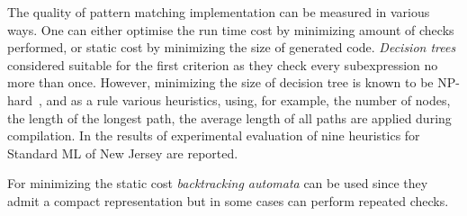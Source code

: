 \begin{comment}
\begin{figure}[ht]
\begin{minipage}[b]{0.3\linewidth}
\centering
\label{fig:figure1}
\end{minipage}
\hspace{0.5cm}
\begin{minipage}[b]{0.3\linewidth}
\centering
\begin{lstlisting}
switch x with 
| true -> 
    switch y with 
    | true -> 
       switch z with 
       | true -> 4
       | _ -> 3
    | _ -> 
      switch z with 
      | true -> 1
      | _ -> 3 
| _ -> 
   switch y with 
   | true -> 2 
   | _ -> if z then 1 else 3
\end{lstlisting}
\end{minipage}
\hspace{0.5cm}
\begin{minipage}[b]{0.3\linewidth}
\centering
\end{minipage}
\end{figure}
\end{comment}



The quality of pattern matching implementation can be measured in various ways. One can either optimise the run time cost by minimizing amount of checks performed, or static
cost by minimizing the size of generated code. \emph{Decision trees}
considered suitable for the first criterion as they check every subexpression no more than once.
However, minimizing the size of decision tree is known to be NP-hard~\cite{baudinet1985tree}, and as a rule various heuristics, using, for example,
the number of nodes, the length of the longest path, the average length of all paths are applied during compilation. In \cite{Scott2000WhenDM} the results of experimental
evaluation of nine heuristics for Standard ML of New Jersey are reported.

For minimizing the static cost \emph{backtracking automata} can be used since they admit a compact representation but in some cases can perform repeated checks.

